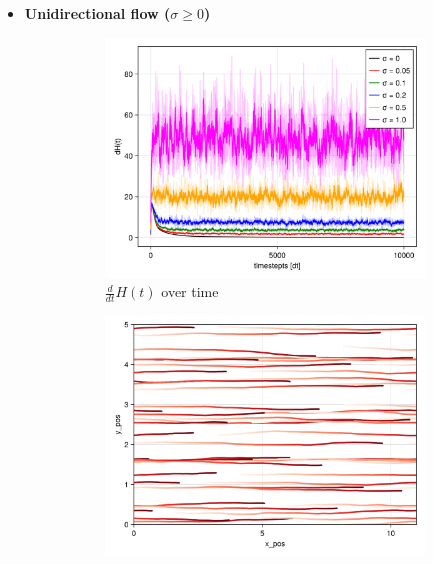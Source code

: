 \begin{itemize}
    \item \textbf{Unidirectional flow ($\sigma \geq 0$)}
    \begin{figure}[H]
        \centering
        \begin{subfigure}{.49\textwidth}
            \centering
            \includegraphics[width=\linewidth]{figures/dH_stochasic_uni.png}
            \caption{$\frac{d}{dt}H(t)$ over time}
            \label{plot:stoc_uni_dh}
        \end{subfigure}
        \begin{subfigure}{.49\textwidth}
            \centering
            \includegraphics[width=\linewidth]{figures/st_unidflow_5000.png}

\end{subfigure}
\end{figure}
\end{itemize}
